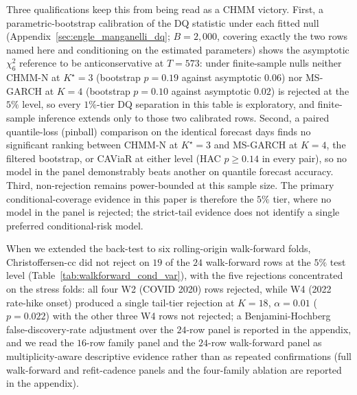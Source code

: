 Three qualifications keep this from being read as a CHMM victory. First, a parametric-bootstrap calibration of the DQ statistic under each fitted null (Appendix~\ref{sec:engle_manganelli_dq}; $B = 2{,}000$, covering exactly the two rows named here and conditioning on the estimated parameters) shows the asymptotic $\chi^2_6$ reference to be anticonservative at $T = 573$: under finite-sample nulls neither CHMM-N at $K^\star = 3$ (bootstrap $p = 0.19$ against asymptotic $0.06$) nor MS-GARCH at $K = 4$ (bootstrap $p = 0.10$ against asymptotic $0.02$) is rejected at the $5\%$ level, so every $1\%$-tier DQ separation in this table is exploratory, and finite-sample inference extends only to those two calibrated rows. Second, a paired quantile-loss (pinball) comparison on the identical forecast days finds no significant ranking between CHMM-N at $K^\star = 3$ and MS-GARCH at $K = 4$, the filtered bootstrap, or CAViaR at either level (HAC $p \ge 0.14$ in every pair), so no model in the panel demonstrably beats another on quantile forecast accuracy. Third, non-rejection remains power-bounded at this sample size. The primary conditional-coverage evidence in this paper is therefore the $5\%$ tier, where no model in the panel is rejected; the strict-tail evidence does not identify a single preferred conditional-risk model.

When we extended the back-test to six rolling-origin walk-forward folds, Christoffersen-cc did not reject on $19$ of the $24$ walk-forward rows at the $5\%$ test level (Table~\ref{tab:walkforward_cond_var}), with the five rejections concentrated on the stress folds: all four W2 (COVID 2020) rows rejected, while W4 (2022 rate-hike onset) produced a single tail-tier rejection at $K = 18$, $\alpha = 0.01$ ($p = 0.022$) with the other three W4 rows not rejected; a Benjamini-Hochberg~\citep{benjamini1995controlling} false-discovery-rate adjustment over the $24$-row panel is reported in the appendix, and we read the $16$-row family panel and the $24$-row walk-forward panel as multiplicity-aware descriptive evidence rather than as repeated confirmations (full walk-forward and refit-cadence panels and the four-family ablation are reported in the appendix).

